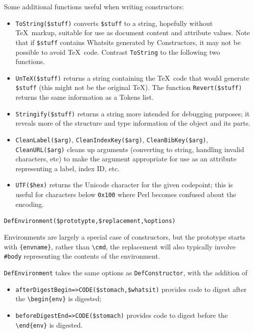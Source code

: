 \documentclass{book}
\newcommand{\ltxcode}{\lstinline[style=latexml]}
\begin{document}
Some additional functions useful when writing constructors:
\begin{itemize}
\item \ltxcode|ToString($stuff)| converts \ltxcode|$stuff| to a string,
  hopefully without \TeX\ markup, suitable for use as document content
  and attribute values.  Note that if \ltxcode|$stuff| contains Whatsits
  generated by Constructors, it may not be possible to avoid \TeX\ code.
  Contrast \ltxcode|ToString| to the following two functions.
\item \ltxcode|UnTeX($stuff)| returns a string containing the \TeX\ code
  that would generate \ltxcode|$stuff| (this might not be the original \TeX).
  The function \ltxcode|Revert($stuff)| returns the same information as a Tokens list.
\item \ltxcode|Stringify($stuff)| returns a string more intended
  for debugging purposes; it reveals more of the structure and type information
  of the object and its parts.
\item \ltxcode|CleanLabel($arg)|,
   \ltxcode|CleanIndexKey($arg)|,
   \ltxcode|CleanBibKey($arg)|,\hfil\\
   \ltxcode|CleanURL($arg)|
  cleans up arguments (converting to string, handling invalid characters, etc)
  to make the argument appropriate for use as an attribute representing
  a label, index ID, etc.
\item \ltxcode|UTF($hex)| returns the Unicode character for the given
codepoint; this is useful for characters below \texttt{0x100} where
Perl becomes confused about the encoding.
\end{itemize}

\par\noindent \ltxcode|DefEnvironment($prototypte,$replacement,%
\par Environments are largely a special case of constructors,
but the prototype starts with \verb|{envname}|, rather than \verb|\cmd|,
the replacement will also typically involve \verb|#body| representing
the contents of the environment.

\texttt{DefEnvironment} takes the same options as  \texttt{DefConstructor},
with the addition of
\begin{itemize}
\item \ltxcode|afterDigestBegin=>CODE($stomach,$whatsit)|
provides code to digest after the \verb|\begin{env}| is digested;
\item \ltxcode|beforeDigestEnd=>CODE($stomach)|
provides code to digest before the \verb|\end{env}| is digested.
\end{itemize}
\end{document}
